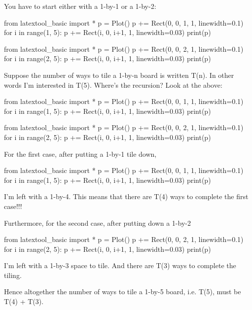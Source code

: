 You have to start either with a 1-by-1 or a 1-by-2:

\begin{python}
from latextool_basic import *
p = Plot()
p += Rect(0, 0, 1, 1, linewidth=0.1)
for i in range(1, 5):
    p += Rect(i, 0, i+1, 1, linewidth=0.03)
print(p)
\end{python}

\begin{python}
from latextool_basic import *
p = Plot()
p += Rect(0, 0, 2, 1, linewidth=0.1)
for i in range(2, 5):
    p += Rect(i, 0, i+1, 1, linewidth=0.03)
print(p)
\end{python}

Suppose the number of ways to tile a 1-by-n board is written T(n). In
other words I'm interested in T(5).
Where's the recursion? Look at the above:

\begin{python}
from latextool_basic import *
p = Plot()
p += Rect(0, 0, 1, 1, linewidth=0.1)
for i in range(1, 5):
    p += Rect(i, 0, i+1, 1, linewidth=0.03)
print(p)
\end{python}

\begin{python}
from latextool_basic import *
p = Plot()
p += Rect(0, 0, 2, 1, linewidth=0.1)
for i in range(2, 5):
    p += Rect(i, 0, i+1, 1, linewidth=0.03)
print(p)
\end{python}

For the first case, after putting a 1-by-1 tile down,
\begin{python}
from latextool_basic import *
p = Plot()
p += Rect(0, 0, 1, 1, linewidth=0.1)
for i in range(1, 5):
    p += Rect(i, 0, i+1, 1, linewidth=0.03)
print(p)
\end{python}

I'm left with a 1-by-4. This means that there are T(4)
ways to complete the first case!!!

Furthermore, for the second case, after putting down a 1-by-2

\begin{python}
from latextool_basic import *
p = Plot()
p += Rect(0, 0, 2, 1, linewidth=0.1)
for i in range(2, 5):
    p += Rect(i, 0, i+1, 1, linewidth=0.03)
print(p)
\end{python}

I'm left with a 1-by-3 space to tile. And there are T(3)
ways to complete the tiling.

Hence altogether the number of ways to tile a 1-by-5 board, i.e. T(5),
must be T(4) + T(3).

